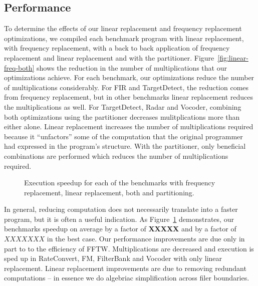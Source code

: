 \subsection{Performance}
To determine the effects of our linear replacement and frequency
replacement optimizations, we compiled each benchmark program with
linear replacement, with frequency replacement, with a back to back application of
frequency replacement and linear replacement and with the partitioner.
Figure~\ref{fig:linear-freq-both} shows the reduction in the number
of multiplications that our optimizations achieve.
For each benchmark, our optimizations reduce the number of multiplications
considerably. For FIR and TargetDetect, the reduction comes from 
frequency replacement, but in other benchmarks linear replacement
reduces the multiplications as well. For TargetDetect, Radar and Vocoder,
combining both optimizations using the partitioner decreases mulitplications
more than either alone. Linear replacement increases the number of multiplications
required because it ``unfactors'' some of the computation that the original
programmer had expressed in the program's structure. With the partitioner,
only beneficial combinations are performed which reduces the number of 
multiplications required.

\begin{figure}[t]
\center
\epsfxsize=3.2in
\vspace{-6pt}
\caption{Execution speedup for each of the benchmarks with 
  frequency replacement, linear replacement, both and partitioning.}
\label{fig:execution-speedup}
\vspace{-6pt}
\end{figure}

In general, reducing computation does not necessarily translate into 
a faster program, but it is often a useful indication.
As Figure~\ref{fig:execution-speedup} 
demonstrates, our benchmarks speedup on average by a factor of {\bf XXXXX} 
and by a factor of $XXXXXXX$ in the best case. 
Our performance improvements are due only in part to to the efficiency of FFTW. 
Multiplications are decreased and execution is sped up in RateConvert, FM, FilterBank and
Vocoder with only linear replacement. Linear replacement improvements are
due to removing redundant computations -- in essence we do algebriac simplification
across filer boundaries.

